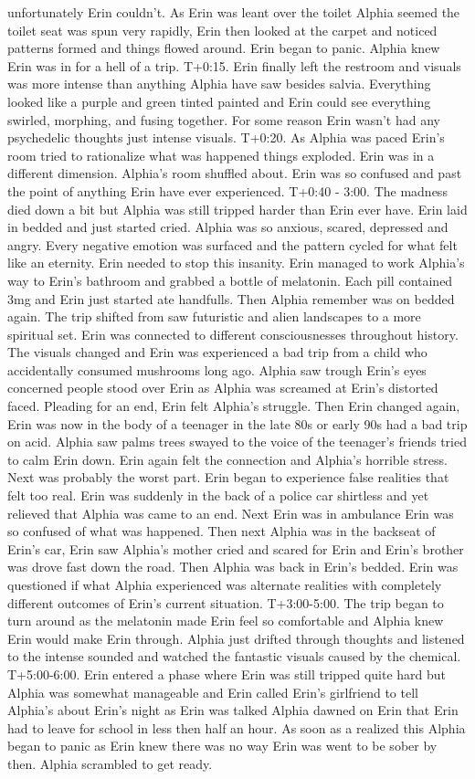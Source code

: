 \documentclass[12pt]{book}
\begin{document}
unfortunately Erin couldn't. As Erin was leant over the toilet Alphia seemed the toilet seat was spun very rapidly, Erin then looked at the carpet and noticed patterns formed and things flowed around. Erin began to panic. Alphia knew Erin was in for a hell of a trip. T+0:15. Erin finally left the restroom and visuals was more intense than anything Alphia have saw besides salvia. Everything looked like a purple and green tinted painted and Erin could see everything swirled, morphing, and fusing together. For some reason Erin wasn't had any psychedelic thoughts just intense visuals. T+0:20. As Alphia was paced Erin's room tried to rationalize what was happened things exploded. Erin was in a different dimension. Alphia's room shuffled about. Erin was so confused and past the point of anything Erin have ever experienced. T+0:40 - 3:00. The madness died down a bit but Alphia was still tripped harder than Erin ever have. Erin laid in bedded and just started cried. Alphia was so anxious, scared, depressed and angry. Every negative emotion was surfaced and the pattern cycled for what felt like an eternity. Erin needed to stop this insanity. Erin managed to work Alphia's way to Erin's bathroom and grabbed a bottle of melatonin. Each pill contained 3mg and Erin just started ate handfulls. Then Alphia remember was on bedded again. The trip shifted from saw futuristic and alien landscapes to a more spiritual set. Erin was connected to different consciousnesses throughout history. The visuals changed and Erin was experienced a bad trip from a child who accidentally consumed mushrooms long ago. Alphia saw trough Erin's eyes concerned people stood over Erin as Alphia was screamed at Erin's distorted faced. Pleading for an end, Erin felt Alphia's struggle. Then Erin changed again, Erin was now in the body of a teenager in the late 80s or early 90s had a bad trip on acid. Alphia saw palms trees swayed to the voice of the teenager's friends tried to calm Erin down. Erin again felt the connection and Alphia's horrible stress. Next was probably the worst part. Erin began to experience false realities that felt too real. Erin was suddenly in the back of a police car shirtless and yet relieved that Alphia was came to an end. Next Erin was in ambulance Erin was so confused of what was happened. Then next Alphia was in the backseat of Erin's car, Erin saw Alphia's mother cried and scared for Erin and Erin's brother was drove fast down the road. Then Alphia was back in Erin's bedded. Erin was questioned if what Alphia experienced was alternate realities with completely different outcomes of Erin's current situation. T+3:00-5:00. The trip began to turn around as the melatonin made Erin feel so comfortable and Alphia knew Erin would make Erin through. Alphia just drifted through thoughts and listened to the intense sounded and watched the fantastic visuals caused by the chemical. T+5:00-6:00. Erin entered a phase where Erin was still tripped quite hard but Alphia was somewhat manageable and Erin called Erin's girlfriend to tell Alphia's about Erin's night as Erin was talked Alphia dawned on Erin that Erin had to leave for school in less then half an hour. As soon as a realized this Alphia began to panic as Erin knew there was no way Erin was went to be sober by then. Alphia scrambled to get ready. 
\end{document}
